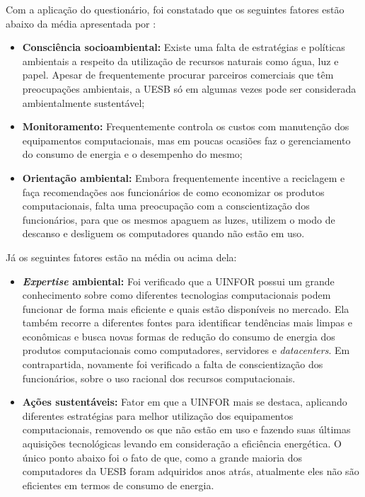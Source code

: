 Com a aplicação do questionário, foi constatado que os seguintes fatores estão abaixo da média apresentada por : 
\begin{itemize}
    \item \textbf{Consciência socioambiental:} Existe uma falta de estratégias e políticas ambientais a respeito da utilização de recursos naturais como água, luz e papel. Apesar de frequentemente procurar parceiros comerciais que têm preocupações ambientais, a UESB só em algumas vezes pode ser considerada ambientalmente sustentável; 
    \item \textbf{Monitoramento:} Frequentemente controla os custos com manutenção dos equipamentos computacionais, mas em poucas ocasiões faz o gerenciamento do consumo de energia e o desempenho do mesmo;
    \item \textbf{Orientação ambiental:} Embora frequentemente incentive a reciclagem e faça recomendações aos funcionários de como economizar os produtos computacionais, falta uma preocupação com a conscientização dos funcionários, para que os mesmos apaguem as luzes, utilizem o modo de descanso e desliguem os computadores quando não estão em uso.
\end{itemize}

Já os seguintes fatores estão na média ou acima dela:

\begin{itemize}
    \item \textbf{\textit{Expertise} ambiental:} Foi verificado que a UINFOR possui um grande conhecimento sobre como diferentes tecnologias computacionais podem funcionar de forma mais eficiente e quais estão disponíveis no mercado. Ela também recorre a diferentes fontes para identificar tendências mais limpas e econômicas e busca novas formas de redução do consumo de energia dos produtos computacionais como computadores, servidores e \textit{datacenters}. Em contrapartida, novamente foi verificado a falta de conscientização dos funcionários, sobre o uso racional dos recursos computacionais. 
    \item \textbf{Ações sustentáveis:} Fator em que a UINFOR mais se destaca, aplicando diferentes estratégias para melhor utilização dos equipamentos computacionais, removendo os que não estão em uso e fazendo suas últimas aquisições tecnológicas levando em consideração a eficiência energética. O único ponto abaixo foi o fato de que, como a grande maioria dos computadores da UESB foram adquiridos anos atrás, atualmente eles não são eficientes em termos de consumo de energia.
\end{itemize}

